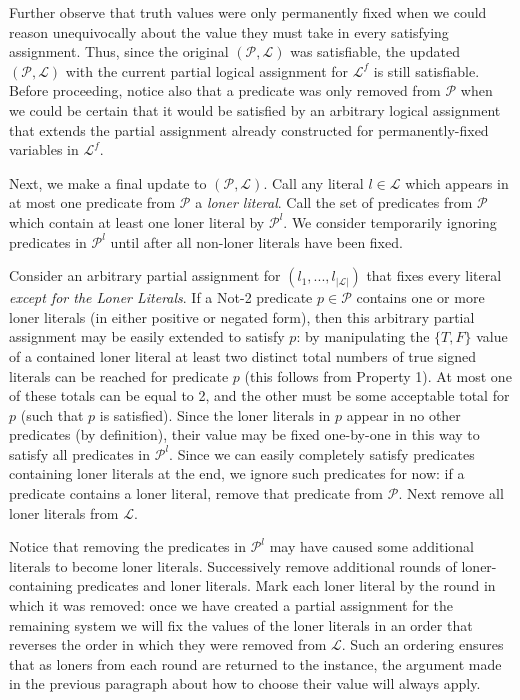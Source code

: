 \documentclass{article}
\begin{document}
Further observe that truth values were only permanently fixed when we could reason unequivocally about the value they must take in every satisfying assignment. Thus, since the original $(\mathcal{P}, \mathcal{L})$ was satisfiable, the updated $(\mathcal{P}, \mathcal{L})$ with the current partial logical assignment for $\mathcal{L}^f$ is still satisfiable. Before proceeding, notice also that a predicate was only removed from $\mathcal{P}$ when we could be certain that it would be satisfied by an arbitrary logical assignment that extends the partial assignment already constructed for permanently-fixed variables in $\mathcal{L}^f$. 

Next, we make a final update to  $(\mathcal{P}, \mathcal{L})$. Call any literal $l\in \mathcal{L}$ which appears in at most one predicate from $\mathcal{P}$ a \textit{loner literal}. Call the set of predicates from $\mathcal{P}$ which contain at least one loner literal by $\mathcal{P}^l$. 
We consider temporarily ignoring predicates in $\mathcal{P}^l$ until after all non-loner literals have been fixed. 

Consider an arbitrary partial assignment for $(l_1,...,l_{|\mathcal{L}|})$ that fixes every literal \textit{except for the Loner Literals}. If a Not-2 predicate  $p\in \mathcal{P}$ contains one or more loner literals (in either positive or negated form), then this arbitrary partial assignment may be easily extended to satisfy $p$: by manipulating the $\{T,F\}$ value of a contained loner literal at least two distinct total numbers of true signed literals can be reached for predicate $p$ (this follows from Property 1). At most one of these totals can be equal to 2, and the other must be some acceptable total for $p$ (such that $p$ is satisfied). Since the loner literals in $p$ appear in no other predicates (by definition), their value may be fixed one-by-one in this way to satisfy all predicates in $\mathcal{P}^l$. Since we can easily completely satisfy predicates containing loner literals at the end, we ignore such predicates for now: if a predicate contains a loner literal, remove that predicate from $\mathcal{P}$. Next remove all loner literals from $\mathcal{L}$. 

Notice that removing the predicates in $\mathcal{P}^l$ may have caused some additional literals to become loner literals. Successively remove additional rounds of loner-containing predicates and loner literals. Mark each loner literal by the round in which it was removed: once we have created a partial assignment for the remaining system we will fix the values of the loner literals in an order that reverses the order in which they were removed from $\mathcal{L}$. Such an ordering ensures that as loners from each round are returned to the instance, the argument made in the previous paragraph about how to choose their value will always apply. 
\end{document}
